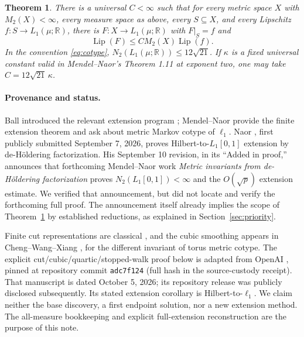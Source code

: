 \documentclass[11pt]{article}
\newtheorem{theorem}{Theorem}
\newcommand{\R}{\mathbb R}
\newcommand{\Lip}{\operatorname{Lip}}
\newcommand{\1}{\mathbf1}
\begin{document}
\begin{samepage}
\begin{theorem}\label{thm:extension}
There is a universal $C<\infty$ such that for every metric space $X$ with $M_2(X)<\infty$, every measure space as above, every $S\subseteq X$, and every Lipschitz $f:S\to L_1(\mu;\R)$, there is $F:X\to L_1(\mu;\R)$ with $F|_S=f$ and
\[\Lip(F)\leq C M_2(X)\Lip(f).\]
In the convention \eqref{eq:cotype}, $N_2(L_1(\mu;\R))\leq12\sqrt{21}$. If $\kappa$ is a fixed universal constant valid in Mendel--Naor's Theorem 1.11 at exponent two, one may take $C=12\sqrt{21}\,\kappa$.
\end{theorem}
\end{samepage}

\paragraph{Provenance and status.}
Ball introduced the relevant extension program \cite{Ball92}; Mendel--Naor \cite[Theorem 1.11, discussion (9), Question 1.15]{MN13} provide the finite extension theorem and ask about metric Markov cotype of $\ell_1$. Naor \cite{Naor26}, first publicly submitted September 7, 2026, proves Hilbert-to-$L_1[0,1]$ extension by de-H\"oldering factorization. His September 10 revision, in its ``Added in proof,'' announces that forthcoming Mendel--Naor work \emph{Metric invariants from de-H\"oldering factorization} proves $N_2(L_1[0,1])<\infty$ and the $O(\sqrt p)$ extension estimate. We verified that announcement, but did not locate and verify the forthcoming full proof. The announcement itself already implies the scope of Theorem~\ref{thm:extension} by established reductions, as explained in Section~\ref{sec:priority}.

Finite cut representations are classical \cite{DL97}, and the cubic smoothing appears in Cheng--Wang--Xiang \cite{CWX26}, for the different invariant of torus metric cotype. The explicit cut/cubic/quartic/stopped-walk proof below is adapted from OpenAI \cite{OAI332}, pinned at repository commit \texttt{adc7f124} (full hash in the source-custody receipt). That manuscript is dated October 5, 2026; its repository release was publicly disclosed subsequently. Its stated extension corollary is Hilbert-to-$\ell_1$. We claim neither the base discovery, a first endpoint solution, nor a new extension method. The all-measure bookkeeping and explicit full-extension reconstruction are the purpose of this note.
\end{document}
